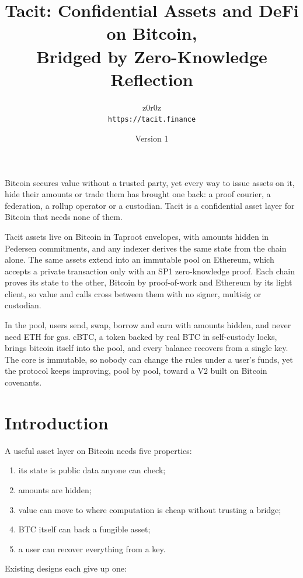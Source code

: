 \documentclass[11pt,letterpaper]{article}
\title{Tacit: Confidential Assets and DeFi on Bitcoin,\\ Bridged by Zero-Knowledge Reflection}
\author{z0r0z \\ \small\texttt{https://tacit.finance}}
\date{Version 1 \quad 2026}
\renewenvironment{abstract}{%
  \begin{center}\bfseries\abstractname\end{center}%
  \small
  \list{}{\leftmargin=2.5em\rightmargin=2.5em\listparindent=0pt\itemindent=0pt
    \parsep=0.6\baselineskip\topsep=0pt}%
  \item\relax}{\endlist\vspace{0.5em}}
\begin{document}
\maketitle

\begin{abstract}
\noindent
Bitcoin secures value without a trusted party, yet every way to issue assets on it, hide
their amounts or trade them has brought one back: a proof courier, a federation, a rollup operator or a
custodian. Tacit is a confidential asset layer for Bitcoin that needs none of them.

Tacit assets live on Bitcoin in Taproot envelopes, with amounts hidden in Pedersen commitments, and any
indexer derives the same state from the chain alone. The same assets extend into an immutable pool on
Ethereum, which accepts a private transaction only with an SP1 zero-knowledge proof. Each chain proves
its state to the other, Bitcoin by proof-of-work and Ethereum by its light client, so value and calls
cross between them with no signer, multisig or custodian.

In the pool, users send, swap, borrow and earn with amounts hidden, and never need ETH for gas. cBTC, a
token backed by real BTC in self-custody locks, brings bitcoin itself into the pool, and every balance
recovers from a single key. The core is immutable, so nobody can change the rules under a user's funds,
yet the protocol keeps improving, pool by pool, toward a V2 built on Bitcoin covenants.
\end{abstract}

\section{Introduction}

A useful asset layer on Bitcoin needs five properties:

\begin{enumerate}
\item its state is public data anyone can check;
\item amounts are hidden;
\item value can move to where computation is cheap without trusting a bridge;
\item BTC itself can back a fungible asset;
\item a user can recover everything from a key.
\end{enumerate}

Existing designs each give up one:
\end{document}
